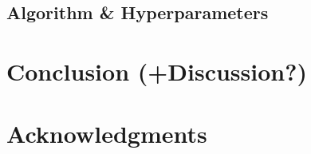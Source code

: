\documentclass{article}
\begin{document}
\subsection{Algorithm \& Hyperparameters}
\section{Conclusion (+Discussion?)}


\section{Acknowledgments}




%
%
%
%
\end{document}
